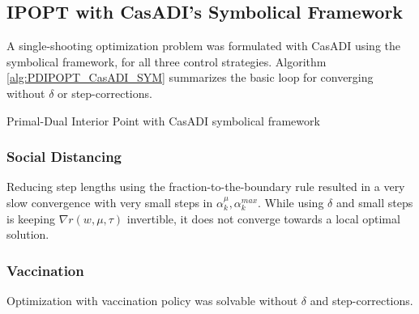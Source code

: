 \subsection{IPOPT with CasADI's Symbolical Framework}
A single-shooting optimization problem was formulated with CasADI using the symbolical framework, for all three control strategies. Algorithm \ref{alg:PDIPOPT_CasADI_SYM} summarizes the basic loop for converging without $\delta$ or step-corrections.


\begin{algorithm}[H]
\SetAlgoLined
{}

 \caption{Primal-Dual Interior Point with CasADI symbolical framework}
 \label{alg:PDIPOPT_CasADI_SYM}
\end{algorithm}

\subsubsection{Social Distancing}

Reducing step lengths using the fraction-to-the-boundary rule resulted in a very slow convergence with very small steps in $\alpha_k^\mu, \alpha_k^{max}$. While using $\delta$ and small steps is keeping $\nabla r(w, \mu, \tau)$ invertible, it does not converge towards a local optimal solution.

\subsubsection{Vaccination}

Optimization with vaccination policy was solvable without $\delta$ and step-corrections.

